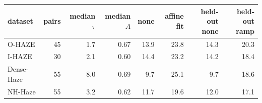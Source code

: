 \begin{tabular}{lrrrrrrr}
\toprule
dataset & pairs & median $\tau$ & median $A$ & none & affine fit & held-out none & held-out ramp \\
\midrule
O-HAZE & 45 & 1.7 & 0.67 & 13.9 & 23.8 & 14.3 & 20.3 \\
I-HAZE & 30 & 2.1 & 0.60 & 14.4 & 23.2 & 14.2 & 18.4 \\
Dense-Haze & 55 & 8.0 & 0.69 & 9.7 & 25.1 & 9.7 & 18.6 \\
NH-Haze & 55 & 3.2 & 0.62 & 11.7 & 19.6 & 12.0 & 17.1 \\
\bottomrule
\end{tabular}

